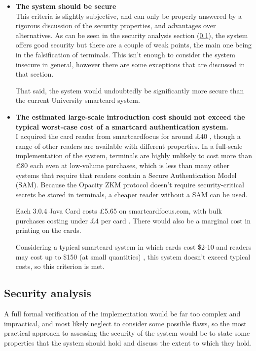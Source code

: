 \documentclass[12pt,a4paper]{article}
\begin{document}
\begin{itemize}
	\item \textbf{The system should be secure}\\
	This criteria is slightly subjective, and can only be properly answered by a rigorous discussion of the security properties, and advantages over alternatives. As can be seen in the security analysis section (\ref{sec:security_analysis}), the system offers good security but there are a couple of weak points, the main one being in the falsification of terminals. This isn't enough to consider the system insecure in general, however there are some exceptions that are discussed in that section.
	
	That said, the system would undoubtedly be significantly more secure than the current University smartcard system.
	
	
	\item \textbf{The estimated large-scale introduction cost should not exceed the typical worst-case cost of a smartcard authentication system.}\\
	I acquired the card reader from smartcardfocus for around \pounds 40 \cite{reader}, though a range of other readers are available with different properties. In a full-scale implementation of the system, terminals are highly unlikely to cost more than \pounds 80 each even at low-volume purchases, which is less than many other systems that require that readers contain a Secure Authentication Model (SAM). Because the Opacity ZKM protocol doesn't require security-critical secrets be stored in terminals, a cheaper reader without a SAM can be used.
	
	Each 3.0.4 Java Card costs \pounds 5.65 on smartcardfocus.com, with bulk purchases costing under \pounds 4 per card \cite{card}. There would also be a marginal cost in printing on the cards.
	
	Considering a typical smartcard system in which cards cost \$2-10 and readers may cost up to \$150 (at small quantities) \cite{generic_costs}, this system doesn't exceed typical costs, so this criterion is met.
	
\end{itemize}


\subsection{Security analysis}
\label{sec:security_analysis}

A full formal verification of the implementation would be far too complex and impractical, and most likely neglect to consider some possible flaws, so the most practical approach to assessing the security of the system would be to state some properties that the system should hold and discuss the extent to which they hold.
\end{document}
